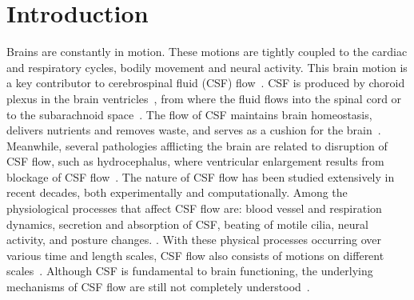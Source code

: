 \documentclass{template}
\begin{document}
\section{Introduction}
Brains are constantly in motion. These motions are tightly coupled
to the cardiac and respiratory cycles, bodily movement and
neural activity. This brain motion is a key contributor to
cerebrospinal fluid (CSF) flow~\citep{Enzmann1992BrainImaging,
baledent2001cerebrospinal, sweetman2011cerebrospinal}.
CSF is produced by choroid plexus in the brain ventricles~\citep{Damkier2013},
from where the fluid flows into the spinal cord or
to the subarachnoid space~\citep{rasmussen2018glymphatic}.
The flow of CSF maintains brain homeostasis,
delivers nutrients and removes waste, and
serves as a cushion for the brain~\citep{fame2020emergence,
kelley2023cerebrospinal, linninger2016cerebrospinal}.
Meanwhile, several pathologies afflicting the brain
are related to disruption of CSF flow,
such as hydrocephalus, where ventricular enlargement
results from blockage of CSF flow~\citep{linninger2016cerebrospinal}.
The nature of CSF flow has been studied extensively
in recent decades, both experimentally and computationally.
Among the physiological processes that affect CSF flow are:
blood vessel and respiration dynamics,
secretion and absorption of CSF,
beating of motile cilia, neural activity, and posture changes.
\citep{kelley2023cerebrospinal, sweetman2011cerebrospinal,
Olstad2019CiliaryDevelopment, Faubel2016CiliaVentricles,
Kurtcuoglu2007ComputationalSylvius, Czosnyka2004CerebrospinalDynamics,
Vinje2019RespiratoryMeasurements, Liu2024UsingBreathing,
baledent2001cerebrospinal}.
With these physical processes occurring
over various time and length scales, CSF flow
also consists of motions on different
scales~\citep{kelley2023cerebrospinal}.
Although CSF is fundamental to brain functioning,
the underlying mechanisms of CSF flow are still not
completely understood~\citep{kelley2023cerebrospinal}.
\end{document}
